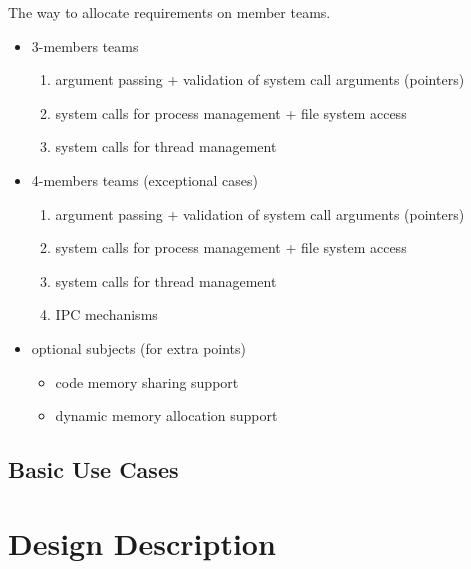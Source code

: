 The way to allocate requirements on member teams. 
\begin{itemize}
    \item 3-members teams
        \begin{enumerate}
            \item argument passing + validation of system call arguments (pointers)
            
            \item system calls for process management + file system access
            
            \item system calls for thread management
            
        \end{enumerate}

    \item 4-members teams (exceptional cases)
        \begin{enumerate}
            \item argument passing + validation of system call arguments (pointers)
            
            \item system calls for process management + file system access
            
            \item system calls for thread management
            
            \item IPC mechanisms
        \end{enumerate}

     \item optional subjects (for extra points)
        \begin{itemize}
            \item code memory sharing support
            \item dynamic memory allocation support
        \end{itemize}

\end{itemize}


\subsection{Basic Use Cases}


\section{Design Description}

